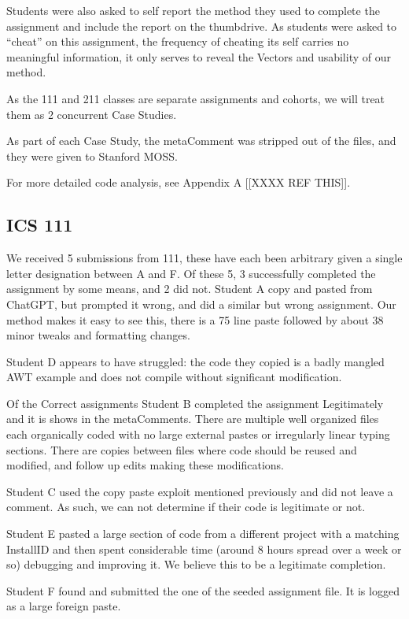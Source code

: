 \documentclass[conference]{IEEEtran}
\newcommand{\installID}{InstallID\xspace}
\newcommand{\metaComment}{metaComment\xspace}
\begin{document}
Students were also asked to self report the method they used to complete the assignment and include the report on the thumbdrive.  As students were asked to ``cheat'' on this assignment, the frequency of cheating its self carries no meaningful information, it only serves to reveal the Vectors and usability of our method.

As the 111 and 211 classes are separate assignments and cohorts, we will treat them as 2 concurrent Case Studies. 

As part of each Case Study, the \metaComment was stripped out of the files, and they were given to Stanford MOSS.

For more detailed code analysis, see Appendix A [[XXXX REF THIS]].
\subsection{\textbf{ICS 111}}
We received 5 submissions from 111, these have each been arbitrary given a single letter designation between A and F.  Of these 5, 3 successfully completed the assignment by some means, and 2 did not.  Student A copy and pasted from ChatGPT, but prompted it wrong, and did a similar but wrong assignment.  Our method makes it easy to see this, there is a 75 line paste followed by about 38 minor tweaks and formatting changes.

Student D appears to have struggled: the code they copied is a badly mangled AWT example and does not compile without significant modification.

Of the Correct assignments Student B completed the assignment Legitimately and it is shows in the \metaComment{}s.  There are multiple well organized files each organically coded with no large external pastes or irregularly linear typing sections.  There are copies between files where code should be reused and modified, and follow up edits making these modifications.

Student C used the copy paste exploit mentioned previously and did not leave a comment.  As such, we can not determine if their code is legitimate or not.

Student E pasted a large section of code from a different project with a matching \installID and then spent considerable time (around 8 hours spread over a week or so) debugging and improving it.  We believe this to be a legitimate completion.

Student F found and submitted the one of the seeded assignment file.  It is logged as a large foreign paste.
\end{document}
